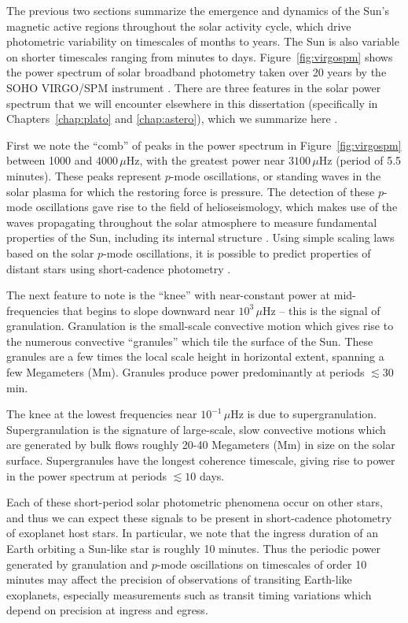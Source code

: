The previous two sections summarize the emergence and dynamics of the Sun's magnetic active regions throughout the solar activity cycle, which drive photometric variability on timescales of months to years. The Sun is also variable on shorter timescales ranging from minutes to days. Figure~\ref{fig:virgospm} shows the power spectrum of solar broadband photometry taken over 20 years by the SOHO VIRGO/SPM instrument \citep{Frohlich1997}. There are three features in the solar power spectrum that we will encounter elsewhere in this dissertation (specifically in Chapters~\ref{chap:plato} and \ref{chap:astero}), which we summarize here \citep[see review by][]{Nordlund2009}. 

First we note the ``comb'' of peaks in the power spectrum in Figure~\ref{fig:virgospm} between 1000 and $4000\,\mu$Hz, with the greatest power near $3100\,\mu$Hz (period of 5.5 minutes). These peaks represent $p$-mode oscillations, or standing waves in the solar plasma for which the restoring force is pressure. The detection of these $p$-mode oscillations gave rise to the field of helioseismology, which makes use of the waves propagating throughout the solar atmosphere to measure fundamental properties of the Sun, including its internal structure \citep{Christensen-Dalsgaard2002}. Using simple scaling laws based on the solar $p$-mode oscillations, it is possible to predict properties of distant stars using short-cadence photometry \citep[e.g.][]{Kjeldsen1995,Kjeldsen2011,Huber2011,Huber2012,Kallinger2014}.

The next feature to note is the ``knee'' with near-constant power at mid-frequencies that begins to slope downward near $10^{3}\,\mu$Hz -- this is the signal of granulation. Granulation is the small-scale convective motion which gives rise to the numerous convective ``granules'' which tile the surface of the Sun. These granules are a few times the local scale height in horizontal extent, spanning a few Megameters (Mm). Granules produce power predominantly at periods $\lesssim30$ min.

The knee at the lowest frequencies near $10^{-1}\,\mu$Hz is due to supergranulation. Supergranulation is the signature of large-scale, slow convective motions which are generated by bulk flows roughly 20-40 Megameters (Mm) in size on the solar surface. Supergranules have the longest coherence timescale, giving rise to power in the power spectrum at periods $\lesssim10$ days. 

Each of these short-period solar photometric phenomena occur on other stars, and thus we can expect these signals to be present in short-cadence photometry of exoplanet host stars. In particular, we note that the ingress duration of an Earth orbiting a Sun-like star is roughly 10 minutes. Thus the periodic power generated by granulation and $p$-mode oscillations on timescales of order 10 minutes may affect the precision of observations of transiting Earth-like exoplanets, especially measurements such as transit timing variations which depend on precision at ingress and egress.

